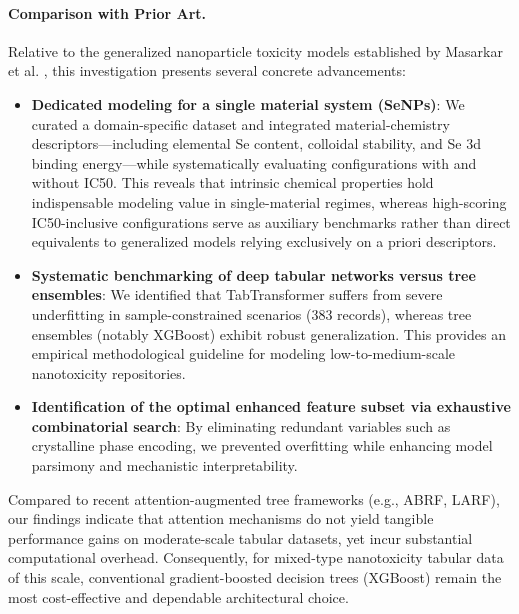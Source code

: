 \documentclass[letterpaper]{article}
\begin{document}
\paragraph{Comparison with Prior Art.}
Relative to the generalized nanoparticle toxicity models established by Masarkar et al. \cite{masarkar2024}, this investigation presents several concrete advancements:
\begin{itemize}
  \item \textbf{Dedicated modeling for a single material system (SeNPs)}: We curated a domain-specific dataset and integrated material-chemistry descriptors—including elemental Se content, colloidal stability, and Se 3d binding energy—while systematically evaluating configurations with and without IC50. This reveals that intrinsic chemical properties hold indispensable modeling value in single-material regimes, whereas high-scoring IC50-inclusive configurations serve as auxiliary benchmarks rather than direct equivalents to generalized models relying exclusively on a priori descriptors.
  \item \textbf{Systematic benchmarking of deep tabular networks versus tree ensembles}: We identified that TabTransformer suffers from severe underfitting in sample-constrained scenarios (383 records), whereas tree ensembles (notably XGBoost) exhibit robust generalization. This provides an empirical methodological guideline for modeling low-to-medium-scale nanotoxicity repositories.
  \item \textbf{Identification of the optimal enhanced feature subset via exhaustive combinatorial search}: By eliminating redundant variables such as crystalline phase encoding, we prevented overfitting while enhancing model parsimony and mechanistic interpretability.
\end{itemize}
Compared to recent attention-augmented tree frameworks (e.g., ABRF, LARF), our findings indicate that attention mechanisms do not yield tangible performance gains on moderate-scale tabular datasets, yet incur substantial computational overhead. Consequently, for mixed-type nanotoxicity tabular data of this scale, conventional gradient-boosted decision trees (XGBoost) remain the most cost-effective and dependable architectural choice.
\end{document}
